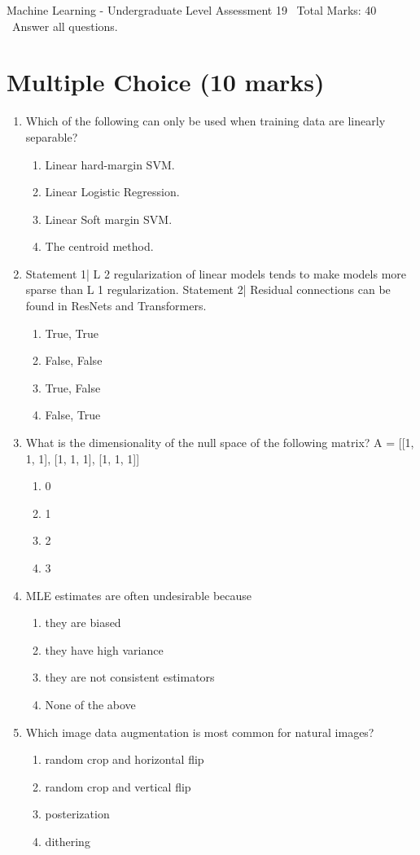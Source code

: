 \documentclass[12pt]{article}
\begin{document}
\begin{center}
Machine Learning - Undergraduate Level Assessment 19 \
Total Marks: 40 \
Answer all questions.
\end{center}

\section*{Multiple Choice (10 marks)}
\begin{enumerate}[label=\arabic*.]
\item Which of the following can only be used when training data are linearly separable?
\begin{enumerate}[label=(\alph*)]
    \item Linear hard-margin SVM.
    \item Linear Logistic Regression.
    \item Linear Soft margin SVM.
    \item The centroid method.
\end{enumerate}
\item Statement 1| L 2 regularization of linear models tends to make models more sparse than L 1 regularization. Statement 2| Residual connections can be found in ResNets and Transformers.
\begin{enumerate}[label=(\alph*)]
    \item True, True
    \item False, False
    \item True, False
    \item False, True
\end{enumerate}
\item What is the dimensionality of the null space of the following matrix? A = [[1, 1, 1], [1, 1, 1], [1, 1, 1]]
\begin{enumerate}[label=(\alph*)]
    \item 0
    \item 1
    \item 2
    \item 3
\end{enumerate}
\item MLE estimates are often undesirable because
\begin{enumerate}[label=(\alph*)]
    \item they are biased
    \item they have high variance
    \item they are not consistent estimators
    \item None of the above
\end{enumerate}
\item Which image data augmentation is most common for natural images?
\begin{enumerate}[label=(\alph*)]
    \item random crop and horizontal flip
    \item random crop and vertical flip
    \item posterization
    \item dithering
\end{enumerate}
\end{enumerate}
\end{document}
